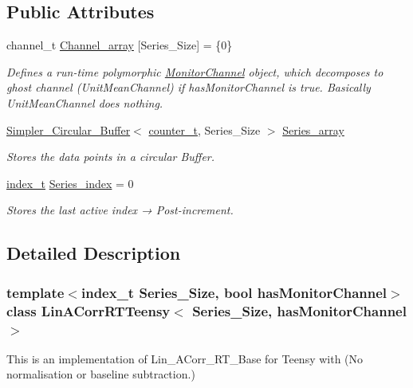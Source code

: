 \subsection*{Public Attributes}
\begin{DoxyCompactItemize}
\item 
channel\+\_\+t \hyperlink{classLinACorrRTTeensy_a3276cb9bb215af9676edc35958c889b8}{Channel\+\_\+array} \mbox{[}Series\+\_\+\+Size\mbox{]} = \{0\}
\begin{DoxyCompactList}\small\item\em Defines a run-\/time polymorphic \hyperlink{classMonitorChannel}{Monitor\+Channel} object, which decomposes to {\ttfamily ghost} channel (Unit\+Mean\+Channel) if {\ttfamily has\+Monitor\+Channel} is true. Basically {\ttfamily Unit\+Mean\+Channel} does nothing. \end{DoxyCompactList}\item 
\hyperlink{classSimpler__Circular__Buffer}{Simpler\+\_\+\+Circular\+\_\+\+Buffer}$<$ \hyperlink{types_8hpp_a22f279793847eba127de149437848c48}{counter\+\_\+t}, Series\+\_\+\+Size $>$ \hyperlink{classLinACorrRTTeensy_a5c4cc1fe032812d6290579c7c8b22e57}{Series\+\_\+array}
\begin{DoxyCompactList}\small\item\em Stores the data points in a circular Buffer. \end{DoxyCompactList}\item 
\hyperlink{types_8hpp_a7c40bb931c31595ed6308605f4537447}{index\+\_\+t} \hyperlink{classLinACorrRTTeensy_abe0523ada55375281deacb143b6055b7}{Series\+\_\+index} = 0
\begin{DoxyCompactList}\small\item\em Stores the last active index → Post-\/increment. \end{DoxyCompactList}\end{DoxyCompactItemize}


\subsection{Detailed Description}
\subsubsection*{template$<$index\+\_\+t Series\+\_\+\+Size, bool has\+Monitor\+Channel$>$\newline
class Lin\+A\+Corr\+R\+T\+Teensy$<$ Series\+\_\+\+Size, has\+Monitor\+Channel $>$}

This is an implementation of Lin\+\_\+\+A\+Corr\+\_\+\+R\+T\+\_\+\+Base for Teensy with {\bfseries }(No normalisation or baseline subtraction.) 

